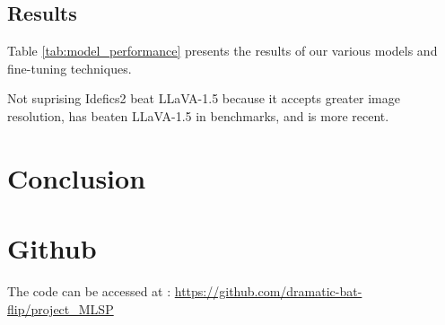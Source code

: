 \documentclass{article}
\begin{document}
\subsection{Results}

Table \ref{tab:model_performance} presents the results of our various models and fine-tuning techniques.


Not suprising Idefics2 beat LLaVA-1.5 because it accepts greater image resolution, has beaten LLaVA-1.5 in benchmarks, and is more recent. 


\section{Conclusion}
\label{sec:conclusion}




\vfill\pagebreak





\section{Github}

The code can be accessed at : \url{https://github.com/dramatic-bat-flip/project_MLSP}
\end{document}
